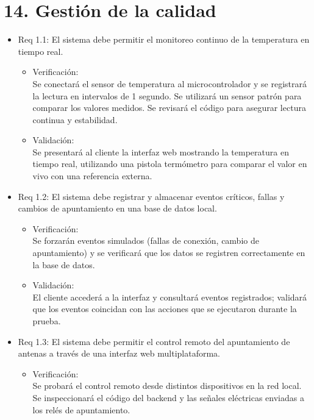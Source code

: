 \documentclass[
11pt, %
]{charter}
\begin{document}
\section{14. Gestión de la calidad}
\label{sec:calidad}

\begin{itemize} 

\item Req 1.1: El sistema debe permitir el monitoreo continuo de la temperatura en tiempo real.

\begin{itemize}
	\item Verificación: \\ Se conectará el sensor de temperatura al microcontrolador y se registrará la lectura en intervalos de 1 segundo. Se utilizará un sensor patrón para comparar los valores medidos. Se revisará el código para asegurar lectura continua y estabilidad.
	\item 	Validación: \\ Se presentará al cliente la interfaz web mostrando la temperatura en tiempo real, utilizando una pistola termómetro para comparar el valor en vivo con una referencia externa.
\end{itemize}

\item Req 1.2: El sistema debe registrar y almacenar eventos críticos, fallas y cambios de apuntamiento en una base de datos local.

\begin{itemize}
	\item Verificación: \\ Se forzarán eventos simulados (fallas de conexión, cambio de apuntamiento) y se verificará que los datos se registren correctamente en la base de datos.

	\item Validación: \\ El cliente accederá a la interfaz y consultará eventos registrados; validará que los eventos coincidan con las acciones que se ejecutaron durante la prueba.

\end{itemize}

\item Req 1.3: El sistema debe permitir el control remoto del apuntamiento de antenas a través de una interfaz web multiplataforma.

\begin{itemize}
	\item Verificación: \\ Se probará el control remoto desde distintos dispositivos en la red local. Se inspeccionará el código del backend y las señales eléctricas enviadas a los relés de apuntamiento.


\end{itemize}
\end{itemize}
\end{document}
